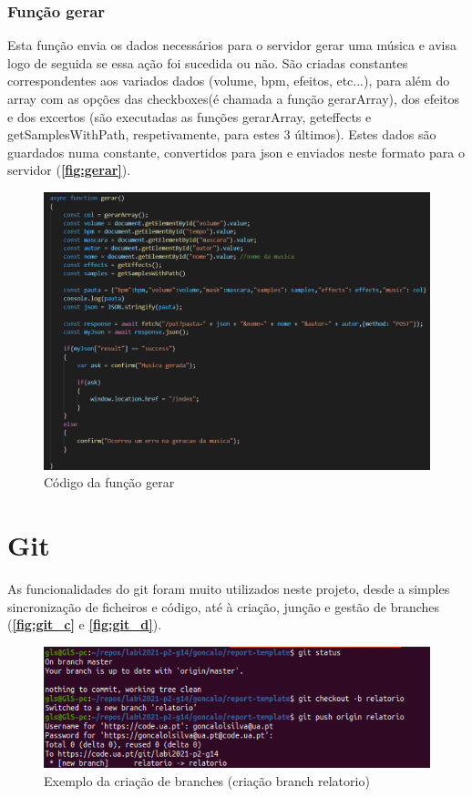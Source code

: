 \documentclass{report}
\begin{document}
\subsubsection{Função gerar}
\label{ssec:gerar}
\hspace{5pt}Esta função envia os dados necessários para o servidor gerar uma música e avisa logo de seguida 
se essa ação foi sucedida ou não. São criadas constantes correspondentes aos variados dados (volume, \ac{bpm}, 
efeitos, etc...), para além do array com as opções das checkboxes(é chamada a função gerarArray), dos efeitos e 
dos excertos (são executadas as funções gerarArray, geteffects e getSamplesWithPath, respetivamente, para estes 
3 últimos). Estes dados são guardados numa constante, convertidos para \ac{json} e enviados neste formato para 
o servidor (\textbf{\autoref{fig:gerar}}). 

\begin{figure}[!h]
\center 
\includegraphics[width=330pt]{img/Funcao_gerar.png}
\caption{Código da função gerar}
\label{fig:gerar}
\end{figure}

\section{Git}
\label{sec:git}
As funcionalidades do git foram muito utilizados neste projeto, desde a simples sincronização 
de ficheiros e código, até à criação, junção e gestão de branches (\textbf{\autoref{fig:git_c}} e 
\textbf{\autoref{fig:git_d}}). 
\cite{git}

\begin{figure}[!h]
\center 
\includegraphics[height=100pt]{img/git_1.png}
\caption{Exemplo da criação de branches (criação branch relatorio)}
\label{fig:git_c}
\end{figure}
\end{document}
